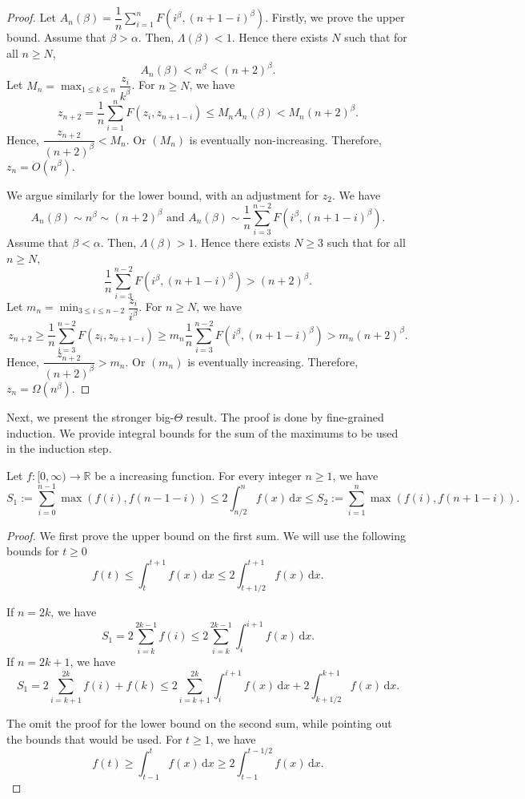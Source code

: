 \begin{proof}
  Let $A_n(\beta) = \dfrac{1}{n}\sum\limits_{i=1}^n F(i^\beta, (n+1-i)^\beta)$. Firstly, we prove the upper bound. Assume that $\beta > \alpha$. Then, $\Lambda(\beta) < 1$. Hence there exists $N$ such that for all $n \ge N$,
  $$A_n(\beta) < n^\beta < (n+2)^\beta.$$
  Let $M_n = \max_{1\le k \le n} \dfrac{z_i}{k^\beta}$. For $n \ge N$, we have
  $$z_{n+2} = \dfrac{1}{n}\sum_{i=1}^n F\left(z_i, z_{n+1-i}\right) \le M_n A_n(\beta) < M_n (n+2)^\beta.$$
  Hence, $\dfrac{z_{n+2}}{(n+2)^\beta} < M_n$. Or $(M_n)$ is eventually non-increasing. Therefore, $z_n = O(n^\beta)$.

  We argue similarly for the lower bound, with an adjustment for $z_2$. We have
  $$A_n(\beta) \sim n^\beta \sim (n+2)^\beta \text{ and } A_n(\beta) \sim \dfrac{1}{n}\sum\limits_{i=3}^{n-2} F(i^\beta, (n+1-i)^\beta).$$
  Assume that $\beta < \alpha$. Then, $\Lambda(\beta) > 1$. Hence there exists $N\ge 3$ such that for all $n \ge N$,
  $$\dfrac{1}{n}\sum\limits_{i=3}^{n-2} F(i^\beta, (n+1-i)^\beta) > (n+2)^\beta.$$
  Let $m_n = \min_{3\le i \le n-2} \dfrac{z_i}{i^\beta}$. For $n \ge N$, we have
  $$z_{n+2} \ge \dfrac{1}{n}\sum_{i=3}^{n-2} F\left(z_i, z_{n+1-i}\right) \ge m_n \dfrac{1}{n}\sum\limits_{i=3}^{n-2} F(i^\beta, (n+1-i)^\beta) > m_n (n+2)^\beta.$$
  Hence, $\dfrac{z_{n+2}}{(n+2)^\beta} > m_n$. Or $(m_n)$ is eventually increasing. Therefore, $z_n = \Omega(n^\beta)$.
\end{proof}

Next, we present the stronger big-$\Theta$ result. The proof is done by fine-grained induction. We provide integral bounds for the sum of the maximums to be used in the induction step.

\begin{lemma}
  \label{lem:integral-bounds}
  Let $f: [0, \infty) \to \mathbb{R}$ be a increasing function. For every integer $n \ge 1$, we have
  $$S_1 := \sum_{i=0}^{n-1} \max(f(i), f(n-1-i)) \le 2\int_{n/2}^n f(x) \, \mathrm{d}x \le S_2 :=\sum_{i=1}^{n} \max(f(i), f(n+1-i)). $$
\end{lemma}

\begin{proof}
  We first prove the upper bound on the first sum. We will use the following bounds for $t\ge 0$
  $$f(t) \le \int_{t}^{t+1} f(x) \, \mathrm{d}x \le 2 \int_{t+1/2}^{t+1} f(x) \, \mathrm{d}x.$$

  If $n=2k$, we have
  $$S_1 = 2 \sum_{i=k}^{2k-1} f(i) \le 2 \sum_{i=k}^{2k-1} \int_{i}^{i+1} f(x) \, \mathrm{d}x.$$
  If $n=2k+1$, we have
  $$ S_1 = 2 \sum_{i=k+1}^{2k} f(i) + f(k) \le 2 \sum_{i=k+1}^{2k} \int_i^{i+1} f(x) \, \mathrm{d}x + 2 \int_{k+1/2}^{k+1} f(x) \, \mathrm{d}x.$$

  The omit the proof for the lower bound on the second sum, while pointing out the bounds that would be used. For $t\ge 1$, we have
  $$f(t) \ge \int_{t-1}^{t} f(x) \, \mathrm{d}x \ge 2 \int_{t-1}^{t-1/2} f(x) \, \mathrm{d}x.$$
\end{proof}

